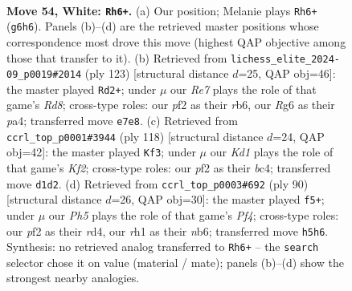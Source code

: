 \documentclass[11pt]{article}
\begin{document}
\clearpage

\begin{figure}[p]\centering
\begin{subfigure}{0.46\textwidth}\centering
\resizebox{\linewidth}{!}{%
\newchessgame
\chessboard[
  setfen={7k/4R3/6R1/2p4P/8/8/1P3p2/3KN2r w - - 9 54},
  showmover=false,
  pgfstyle=straightmove, color=movearrow, markmove={g6-h6}
]}
\caption{}
\end{subfigure}\hfill
\begin{subfigure}{0.46\textwidth}\centering
\resizebox{\linewidth}{!}{%
\newchessgame
\chessboard[
  setfen={3R4/8/1R1n2p1/p3k1P1/P7/1p3P2/7K/3r4 b - - 0 62},
  showmover=false,
  pgfstyle=straightmove, color=movearrow, markmove={d1-d2}
]}
\caption{}
\end{subfigure}
\\[4pt]
\begin{subfigure}{0.46\textwidth}\centering
\resizebox{\linewidth}{!}{%
\newchessgame
\chessboard[
  setfen={8/7k/6p1/4R3/1Pb5/7P/r3NK2/8 w - - 1 60},
  showmover=false,
  pgfstyle=straightmove, color=movearrow, markmove={f2-f3}
]}
\caption{}
\end{subfigure}\hfill
\begin{subfigure}{0.46\textwidth}\centering
\resizebox{\linewidth}{!}{%
\newchessgame
\chessboard[
  setfen={8/2R5/1n2k1p1/8/2Nr1P2/8/5K2/8 w - - 0 46},
  showmover=false,
  pgfstyle=straightmove, color=movearrow, markmove={f4-f5}
]}
\caption{}
\end{subfigure}
\caption{\textbf{Move 54, White: \texttt{Rh6+}.} (a) Our position; Melanie plays \texttt{Rh6+} (\texttt{g6h6}). Panels (b)--(d) are the retrieved master positions whose correspondence most drove this move (highest QAP objective among those that transfer to it). (b) Retrieved from \texttt{lichess\_elite\_2024-09\_p0019\#2014} (ply 123) [structural distance $d$=25, QAP obj=46]: the master played \texttt{Rd2+}; under $\mu$ our \emph{Re7} plays the role of that game's \emph{Rd8}; cross-type roles: our \emph{p}f2 as their \emph{r}b6, our \emph{R}g6 as their \emph{p}a4; transferred move \texttt{e7e8}. (c) Retrieved from \texttt{ccrl\_top\_p0001\#3944} (ply 118) [structural distance $d$=24, QAP obj=42]: the master played \texttt{Kf3}; under $\mu$ our \emph{Kd1} plays the role of that game's \emph{Kf2}; cross-type roles: our \emph{p}f2 as their \emph{b}c4; transferred move \texttt{d1d2}. (d) Retrieved from \texttt{ccrl\_top\_p0003\#692} (ply 90) [structural distance $d$=26, QAP obj=30]: the master played \texttt{f5+}; under $\mu$ our \emph{Ph5} plays the role of that game's \emph{Pf4}; cross-type roles: our \emph{p}f2 as their \emph{r}d4, our \emph{r}h1 as their \emph{n}b6; transferred move \texttt{h5h6}. Synthesis: no retrieved analog transferred to \texttt{Rh6+} -- the \texttt{search} selector chose it on value (material / mate); panels (b)--(d) show the strongest nearby analogies.}
\label{fig:thought-m106}
\end{figure}
\end{document}
